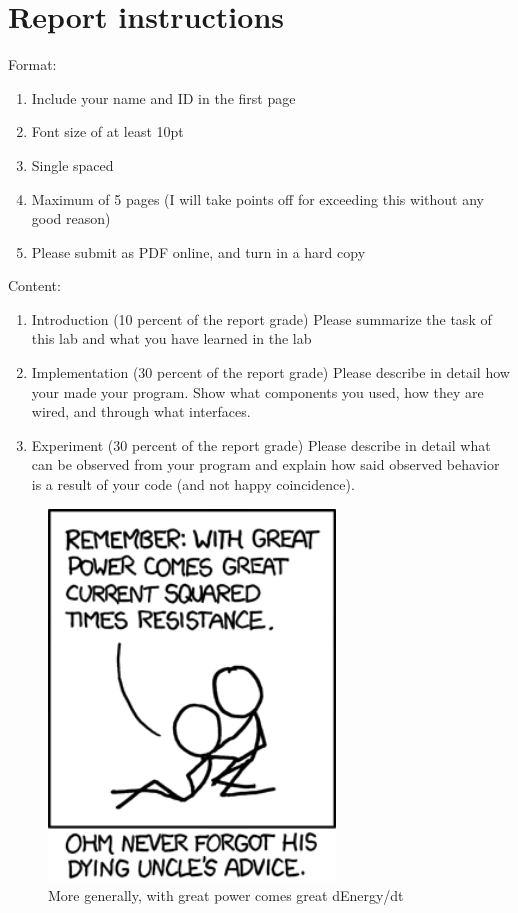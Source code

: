 \documentclass[letterpaper,12pt]{article}
\begin{document}
\section*{Report instructions}
Format:
\begin{enumerate}
   \item Include your name and ID in the first page
   \item Font size of at least 10pt
   \item Single spaced
   \item Maximum of 5 pages (I will take points off for exceeding this without any good reason)
   \item Please submit as PDF online, and turn in a hard copy
\end{enumerate}
Content:
\begin{enumerate}
   \item Introduction (10 percent of the report grade) Please summarize the task of this lab and what you have learned in the lab
   \item Implementation (30 percent of the report grade) Please describe in detail how your made your program. Show what components you used, how they are wired, and through what interfaces.
   \item Experiment (30 percent of the report grade) Please describe in detail what can be observed from your program and explain how said observed behavior is a result of your code (and not happy coincidence).
\end{enumerate}

\begin{figure}[ht!]
	\centering
	\includegraphics[width=3in]{ohm.png}
   \caption*{More generally, with great power comes great dEnergy/dt}
\end{figure}
\end{document}
